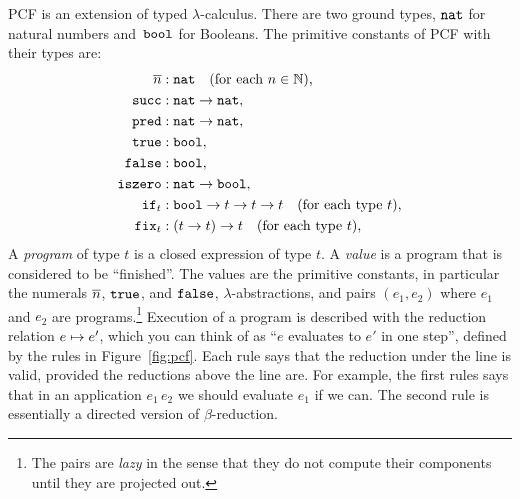 PCF is an extension of typed $\lambda$-calculus. There are two ground
types, $\mathtt{nat}$ for natural numbers and~$\mathtt{bool}$ for Booleans. The
primitive constants of PCF with their types are:
%
\begin{align*}
  \overline{n} &: \mathtt{nat} \quad \text{(for each $n \in \mathbb{N}$),} \\
  \mathtt{succ} &: \mathtt{nat} \to \mathtt{nat}, \\
  \mathtt{pred} &: \mathtt{nat} \to \mathtt{nat}, \\
  \mathtt{true} &: \mathtt{bool}, \\
  \mathtt{false} &: \mathtt{bool}, \\
  \mathtt{iszero} &: \mathtt{nat} \to \mathtt{bool}, \\
  \mathtt{if}_t &: \mathtt{bool} \to t \to t \to t \quad\text{(for each type $t$),}\\
  \mathtt{fix}_t &: (t \to t) \to t \quad\text{(for each type $t$),}
\end{align*}
%
A \emph{program} of type $t$ is a closed expression of type $t$. A
\emph{value} is a program that is considered to be ``finished''. The
values are the primitive constants, in particular the numerals
$\overline{n}$, $\mathtt{true}$, and $\mathtt{false}$, $\lambda$-abstractions,
and pairs $(e_1, e_2)$ where $e_1$ and $e_2$ are
programs.\footnote{The pairs are \emph{lazy} in the sense that they do
  not compute their components until they are projected out.}
Execution of a program is described with the reduction relation $e
\mapsto e'$, which you can think of as ``$e$ evaluates to $e'$ in one
step'', defined by the rules in Figure~\ref{fig:pcf}. Each rule says
that the reduction under the line is valid, provided the reductions
above the line are. For example, the first rules says that in an
application $e_1\,e_2$ we should evaluate $e_1$ if we can. The second
rule is essentially a directed version of $\beta$-reduction.

